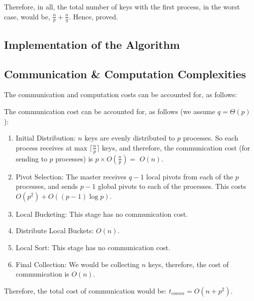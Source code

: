 \documentclass{article}
\begin{document}
Therefore, in all, the total number of keys with the first
process, in the worst case, would be, $\frac{n}{p} + \frac{n}{q}$.
Hence, proved.

\subsection{Implementation of the Algorithm}

\subsection{Communication \& Computation Complexities}
The communication and computation costs can be accounted for, as
follows:

The communication cost can be accounted for, as follows (we assume
$q = \Theta(p)$):
\begin{enumerate}
\item Initial Distribution: $n$ keys are evenly distributed to 
$p$ processes. So each process receives at max 
$\lceil\frac{n}{p}\rceil$ keys, and therefore, the communication 
cost  (for sending to $p$ processes) is $p \times O(\frac{n}{p}) =$
$ O(n)$.
\item Pivot Selection: The master receives $q-1$ local pivots from 
each of the $p$ processes, and sends $p-1$ global pivots to each 
of the processes. This costs $O(p^2) + O((p-1)\log{p})$.  
\item Local Bucketing: This stage has no communication cost.
\item Distribute Local Buckets: $O(n)$.
\item Local Sort: This stage has no communication cost.
\item Final Collection: We would be collecting $n$ keys, therefore,
the cost of communication is $O(n)$.
\end{enumerate}
Therefore, the total cost of communication would be: 
$t_{comm} = O(n + p^2)$.
\end{document}
